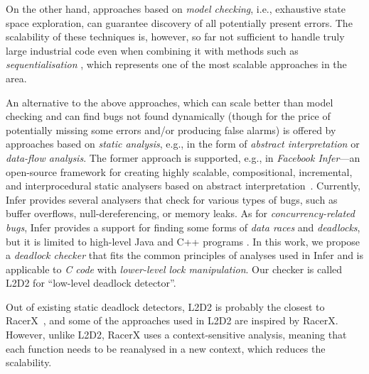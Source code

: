 \documentclass[runningheads]{llncs}
\begin{document}
On the other hand, approaches based on \emph{model checking}, i.e., exhaustive
state space exploration, can guarantee discovery of all potentially present
errors.
%
%
The scalability of these techniques is, however, so far not sufficient to handle
truly large industrial code even when combining it with methods such as
\emph{sequentialisation} \cite{lazy-seq-16}, 
%
%
which represents one of the most scalable approaches in the area.

An alternative to the above approaches, which can scale better than model
checking and can find bugs not found dynamically (though for the price of
potentially missing some errors and/or producing false alarms) is offered by
approaches based on \emph{static analysis}, e.g., in the form of \emph{abstract
interpretation} or \emph{data-flow analysis}.
%
The former approach is supported, e.g., in \emph{Facebook Infer}---an
open-source framework for creating highly scalable, compositional, incremental,
and interprocedural static analysers based on abstract
interpretation~\cite{inferNFM15}.
%
%
%
Currently, Infer provides several analysers that check for various types of
bugs, such as buffer overflows, null-dereferencing, or memory leaks.
%
%
As for \emph{concurrency-related bugs}, Infer provides a support for finding
some forms of \emph{data races} and \emph{deadlocks}, but it is limited to
high-level Java and C++ programs \cite{racerD18,inferCACM19}.
%
In this work, we propose a \emph{deadlock checker} that fits the common
principles of analyses used in Infer and is applicable to \emph{C code} with
\emph{lower-level lock manipulation}.
%
Our checker is called L2D2 for ``low-level deadlock detector''.

\enlargethispage{6mm}

Out of existing static deadlock detectors, L2D2 is probably the closest to
\mbox{RacerX}~\cite{racerX03}, and some of the approaches used in L2D2 are
inspired by RacerX.
%
However, unlike L2D2, RacerX uses a context-sensitive analysis, meaning that
each function needs to be reanalysed in a new context, which reduces the
scalability.
\end{document}
